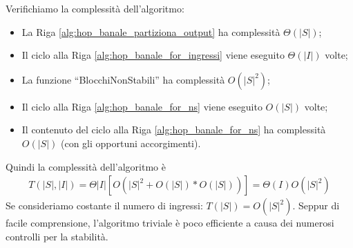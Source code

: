 Verifichiamo la complessità dell'algoritmo:
\begin{itemize}
    \item La Riga \ref{alg:hop_banale_partiziona_output} ha complessità $\Theta(|S|)$;
    \item Il ciclo alla Riga \ref{alg:hop_banale_for_ingressi} viene eseguito $\Theta(|I|)$ volte;
    \item La funzione ``BlocchiNonStabili'' ha complessità $O(|S|^2)$;
    \item Il ciclo alla Riga \ref{alg:hop_banale_for_ns} viene eseguito $O(|S|)$ volte;
    \item Il contenuto del ciclo alla Riga \ref{alg:hop_banale_for_ns} ha complessità $O(|S|)$ (con gli opportuni accorgimenti).
\end{itemize}
Quindi la complessità dell'algoritmo è \begin{gather*}
    T(|S|,|I|) = \Theta|I|\left[O(|S|^2 + O(|S|) * O(|S|))\right] = \Theta(I)O(|S|^2)
\end{gather*}
Se consideriamo costante il numero di ingressi: $T(|S|) = O(|S|^2)$. Seppur di facile comprensione, l'algoritmo triviale è poco efficiente a causa dei numerosi controlli per la stabilità.

